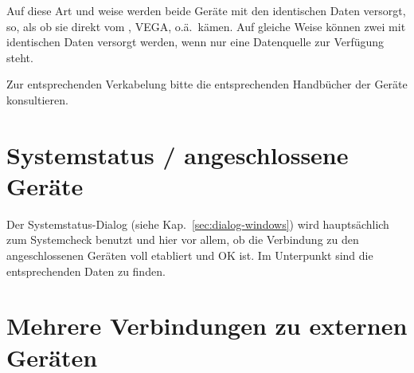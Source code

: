%



Auf diese Art und weise werden beide Geräte mit den identischen Daten versorgt, so, als ob sie direkt vom \fl, VEGA, o.ä.\ kämen. 
Auf gleiche Weise können zwei \al mit identischen Daten versorgt werden, wenn nur eine Datenquelle zur Verfügung steht.

Zur entsprechenden Verkabelung bitte die entsprechenden Handbücher der Geräte konsultieren.

\section{Systemstatus / angeschlossene Geräte}\label{sec:system-status-dialog}

Der Systemstatus-Dialog (siehe Kap.~\ref{sec:dialog-windows}) wird hauptsächlich zum Systemcheck benutzt und hier vor allem, ob die Verbindung zu den angeschlossenen 
Geräten voll etabliert und OK ist. 
Im Unterpunkt  sind die entsprechenden Daten zu finden.
\section{Mehrere Verbindungen zu externen Geräten}

